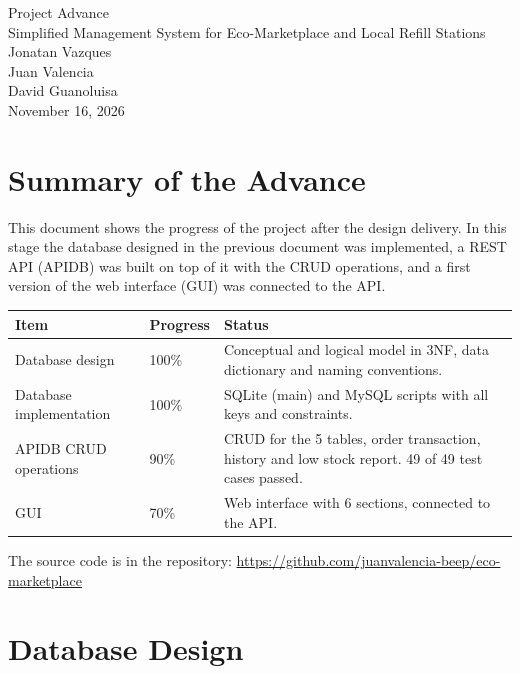 \documentclass[11pt]{article}
\renewcommand{\_}{\oldus\allowbreak}
\newcommand{\repourl}{https://github.com/juanvalencia-beep/eco-marketplace}
\begin{document}
\begin{center}
  {\LARGE Project Advance}\\[0.6em]
  {\large Simplified Management System for Eco-Marketplace and Local Refill Stations}\\[2em]
  Jonatan Vazques\\[0.5em]
  Juan Valencia\\[0.5em]
  David Guanoluisa\\[1em]
  November 16, 2026
\end{center}

\vspace{1em}

\section{Summary of the Advance}

This document shows the progress of the project after the design delivery. In this stage the
database designed in the previous document was implemented, a REST API (APIDB) was built on top of
it with the CRUD operations, and a first version of the web interface (GUI) was connected to the API.

\begin{center}
\begin{tabular}{p{5.2cm} p{2.2cm} p{7.2cm}}
\toprule
\textbf{Item} & \textbf{Progress} & \textbf{Status} \\
\midrule
Database design & 100\% & Conceptual and logical model in 3NF, data dictionary and naming conventions. \\
Database implementation & 100\% & SQLite (main) and MySQL scripts with all keys and constraints. \\
APIDB CRUD operations & 90\% & CRUD for the 5 tables, order transaction, history and low stock report. 49 of 49 test cases passed. \\
GUI & 70\% & Web interface with 6 sections, connected to the API. \\
\bottomrule
\end{tabular}
\end{center}

The source code is in the repository: \url{\repourl}

\section{Database Design}
\end{document}
